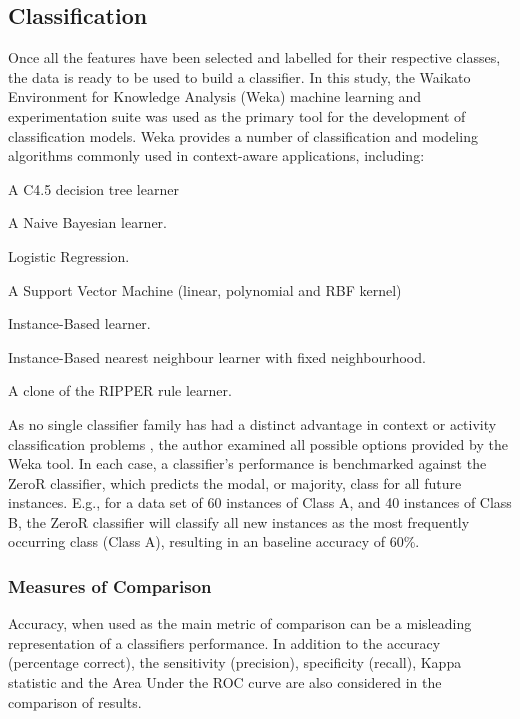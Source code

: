 \subsection{Classification}
Once all the features have been selected and labelled for their respective classes, the data is ready to be used to build a classifier. In this study, the Waikato Environment for Knowledge Analysis (Weka)  machine learning and experimentation suite \cite{Hornik2009} was used as the primary tool for the development of classification models. Weka provides a number of classification and modeling algorithms commonly used in context-aware applications, including:
\begin{description}[noitemsep,topsep=0pt]
	\item [J48] A C4.5 decision tree learner
	\item [NaiveBayes] A Naive Bayesian learner.
	\item [Logistic] Logistic Regression.
	\item [SMO] A Support Vector Machine (linear, polynomial and RBF kernel)
	\item [KStar] Instance-Based learner.
	\item [IBk] Instance-Based nearest neighbour learner with fixed neighbourhood.
	\item [JRip] A clone of the RIPPER rule learner.
\end{description}

As no single classifier family has had a distinct advantage in context or activity classification problems \cite{Mitchell2013a}, the author examined all possible options provided by the Weka tool. In each case, a classifier's performance is benchmarked against the ZeroR classifier, which predicts the modal, or majority, class for all future instances. E.g., for a data set of 60 instances of Class A, and 40 instances of Class B, the ZeroR classifier will classify all new instances as the most frequently occurring class (Class A), resulting in an baseline accuracy of 60\%.

\subsubsection{Measures of Comparison}
Accuracy, when used as the main metric of comparison can be a misleading representation of a classifiers performance. In addition to the accuracy (percentage correct), the sensitivity (precision), specificity (recall), Kappa statistic and the Area Under the ROC curve are also considered in the comparison of results.

